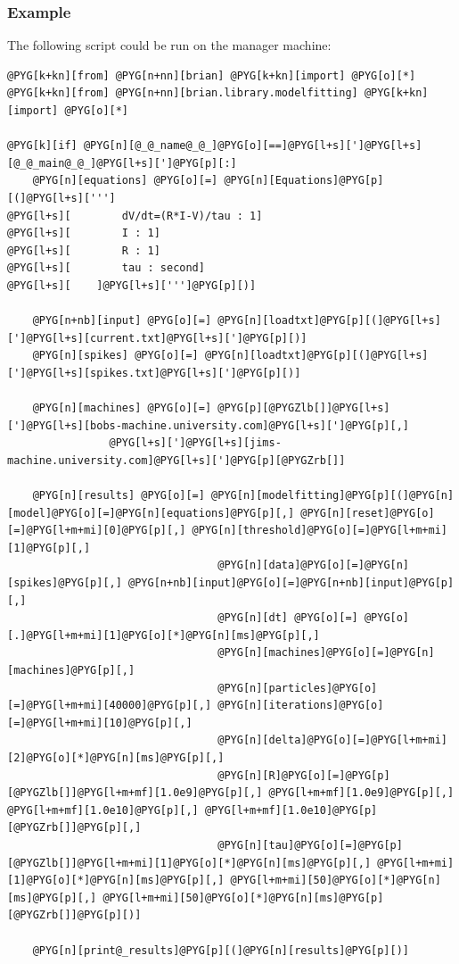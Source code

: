 \documentclass[letterpaper,10pt,english]{manual}
\begin{document}
\subsubsection{Example}

The following script could be run on the manager machine:

\begin{Verbatim}[commandchars=@\[\]]
@PYG[k+kn][from] @PYG[n+nn][brian] @PYG[k+kn][import] @PYG[o][*]
@PYG[k+kn][from] @PYG[n+nn][brian.library.modelfitting] @PYG[k+kn][import] @PYG[o][*]

@PYG[k][if] @PYG[n][@_@_name@_@_]@PYG[o][==]@PYG[l+s][']@PYG[l+s][@_@_main@_@_]@PYG[l+s][']@PYG[p][:]
    @PYG[n][equations] @PYG[o][=] @PYG[n][Equations]@PYG[p][(]@PYG[l+s][''']
@PYG[l+s][        dV/dt=(R*I-V)/tau : 1]
@PYG[l+s][        I : 1]
@PYG[l+s][        R : 1]
@PYG[l+s][        tau : second]
@PYG[l+s][    ]@PYG[l+s][''']@PYG[p][)]

    @PYG[n+nb][input] @PYG[o][=] @PYG[n][loadtxt]@PYG[p][(]@PYG[l+s][']@PYG[l+s][current.txt]@PYG[l+s][']@PYG[p][)]
    @PYG[n][spikes] @PYG[o][=] @PYG[n][loadtxt]@PYG[p][(]@PYG[l+s][']@PYG[l+s][spikes.txt]@PYG[l+s][']@PYG[p][)]

    @PYG[n][machines] @PYG[o][=] @PYG[p][@PYGZlb[]]@PYG[l+s][']@PYG[l+s][bobs-machine.university.com]@PYG[l+s][']@PYG[p][,]
                @PYG[l+s][']@PYG[l+s][jims-machine.university.com]@PYG[l+s][']@PYG[p][@PYGZrb[]]

    @PYG[n][results] @PYG[o][=] @PYG[n][modelfitting]@PYG[p][(]@PYG[n][model]@PYG[o][=]@PYG[n][equations]@PYG[p][,] @PYG[n][reset]@PYG[o][=]@PYG[l+m+mi][0]@PYG[p][,] @PYG[n][threshold]@PYG[o][=]@PYG[l+m+mi][1]@PYG[p][,]
                                 @PYG[n][data]@PYG[o][=]@PYG[n][spikes]@PYG[p][,] @PYG[n+nb][input]@PYG[o][=]@PYG[n+nb][input]@PYG[p][,]
                                 @PYG[n][dt] @PYG[o][=] @PYG[o][.]@PYG[l+m+mi][1]@PYG[o][*]@PYG[n][ms]@PYG[p][,]
                                 @PYG[n][machines]@PYG[o][=]@PYG[n][machines]@PYG[p][,]
                                 @PYG[n][particles]@PYG[o][=]@PYG[l+m+mi][40000]@PYG[p][,] @PYG[n][iterations]@PYG[o][=]@PYG[l+m+mi][10]@PYG[p][,]
                                 @PYG[n][delta]@PYG[o][=]@PYG[l+m+mi][2]@PYG[o][*]@PYG[n][ms]@PYG[p][,]
                                 @PYG[n][R]@PYG[o][=]@PYG[p][@PYGZlb[]]@PYG[l+m+mf][1.0e9]@PYG[p][,] @PYG[l+m+mf][1.0e9]@PYG[p][,] @PYG[l+m+mf][1.0e10]@PYG[p][,] @PYG[l+m+mf][1.0e10]@PYG[p][@PYGZrb[]]@PYG[p][,]
                                 @PYG[n][tau]@PYG[o][=]@PYG[p][@PYGZlb[]]@PYG[l+m+mi][1]@PYG[o][*]@PYG[n][ms]@PYG[p][,] @PYG[l+m+mi][1]@PYG[o][*]@PYG[n][ms]@PYG[p][,] @PYG[l+m+mi][50]@PYG[o][*]@PYG[n][ms]@PYG[p][,] @PYG[l+m+mi][50]@PYG[o][*]@PYG[n][ms]@PYG[p][@PYGZrb[]]@PYG[p][)]

    @PYG[n][print@_results]@PYG[p][(]@PYG[n][results]@PYG[p][)]
\end{Verbatim}
\end{document}
